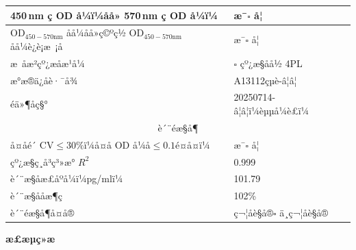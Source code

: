 \documentclass[UTF8,10pt,a4paper,fontset=fandol]{ctexart}
\newcommand{\fieldvalue}[1]{#1}
\newcommand{\handwritten}[1]{#1}
\begin{document}
\begin{tabular}{|p{}|p{}|}
\hline
450\,nm ç OD å¼ï¼åå» 570\,nm ç OD å¼ï¼ &
\fieldvalue{æ¯}\quad $\square$ å¦
\\ \hline
OD$_{450-570\text{nm}}$ åå¼åå»ç©ºç½ OD$_{450-570\text{nm}}$ åå¼è¿è¡æ ¡å &
\fieldvalue{æ¯}\quad $\square$ å¦
\\ \hline
æ åæ²çº¿æåæ¹å¼ &
$\square$ çº¿æ§åå½\quad
\fieldvalue{4PL}
\\ \hline
æ°æ®ä¿å­è·¯å¾ &
\fieldvalue{\handwritten{A13112çµè-â¦â¦}}
\\ \hline
éä»¶åç§° &
\fieldvalue{\handwritten{20250714-â¦â¦ï¼èµµå¼è£ï¼}}
\\ \hline
\multicolumn{2}{|c|}{è´¨éæ§å¶} \\ \hline
å¤å­é´ CV$\leq 30\%$ï¼å¤å­ OD å¼å$\leq 0.1$é¤å¤ï¼ &
\fieldvalue{æ¯}\quad $\square$ å¦
\\ \hline
çº¿æ§ç¸å³ç³»æ° $R^2$ &
\fieldvalue{\handwritten{0.999}}
\\ \hline
è´¨æ§åæ£åºå¼ï¼pg/mlï¼ &
\fieldvalue{\handwritten{101.79}}
\\ \hline
è´¨æ§ååæ¶ç &
\fieldvalue{\handwritten{102\%}}
\\ \hline
è´¨éæ§å¶å¤å® &
\fieldvalue{ç¬¦åè§å®}\quad $\square$ ä¸ç¬¦åè§å®
\\ \hline
\end{tabular}

\vspace{0.5em}

\begin{center}
\textbf{æ£æµç»æ}
\end{center}
\end{document}
